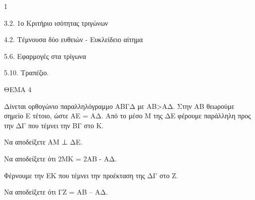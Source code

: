 \begin{ylh}{1}
    \item 3.2. 1ο Κριτήριο ισότητας τριγώνων
    \item 4.2. Τέμνουσα δύο ευθειών - Ευκλείδειο αίτημα
    \item 5.6. Εφαρμογές στα τρίγωνα
    \item 5.10. Τραπέζιο.
\end{ylh}

ΘΕΜΑ 4

Δίνεται ορθογώνιο παραλληλόγραμμο ΑΒΓΔ με ΑΒ\textgreater ΑΔ. Στην ΑΒ θεωρούμε σημείο Ε τέτοιο, ώστε ΑΕ = ΑΔ. Από το μέσο Μ της ΔΕ φέρουμε παράλληλη προς την ΔΓ που τέμνει την ΒΓ στο Κ.

\begin{alist}
\item Να αποδείξετε ΑΜ ⊥ ΔΕ. 

\item Να αποδείξετε ότι 2ΜΚ = 2ΑΒ - ΑΔ. 

\item Φέρνουμε την ΕΚ που τέμνει την προέκταση της ΔΓ στο Ζ.

Να αποδείξετε ότι ΓΖ = ΑΒ -- ΑΔ. 
\end{alist}

